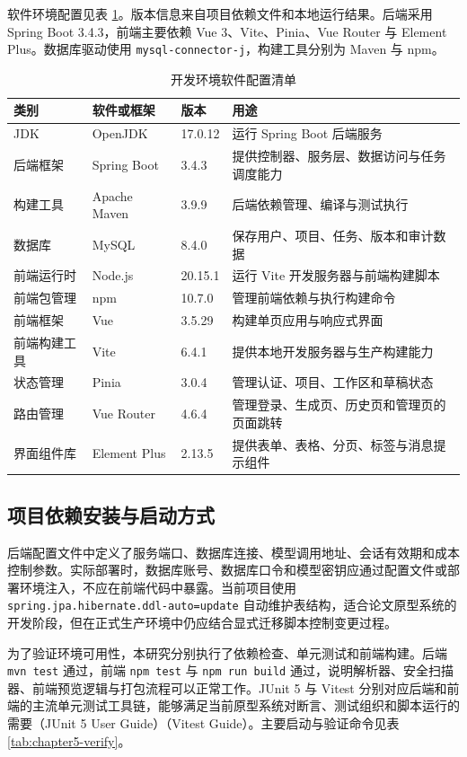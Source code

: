 软件环境配置见表 \ref{tab:chapter5-software}。版本信息来自项目依赖文件和本地运行结果。后端采用 Spring Boot 3.4.3，前端主要依赖 Vue 3、Vite、Pinia、Vue Router 与 Element Plus。数据库驱动使用 \texttt{mysql-connector-j}，构建工具分别为 Maven 与 npm。

\begin{table}[!htbp]
\centering
\caption{开发环境软件配置清单}
\label{tab:chapter5-software}
\small
\begin{tabular}{@{}p{}p{}p{}p{}@{}}
\toprule
类别 & 软件或框架 & 版本 & 用途 \\
\midrule
JDK & OpenJDK & 17.0.12 & 运行 Spring Boot 后端服务 \\
后端框架 & Spring Boot & 3.4.3 & 提供控制器、服务层、数据访问与任务调度能力 \\
构建工具 & Apache Maven & 3.9.9 & 后端依赖管理、编译与测试执行 \\
数据库 & MySQL & 8.4.0 & 保存用户、项目、任务、版本和审计数据 \\
前端运行时 & Node.js & 20.15.1 & 运行 Vite 开发服务器与前端构建脚本 \\
前端包管理 & npm & 10.7.0 & 管理前端依赖与执行构建命令 \\
前端框架 & Vue & 3.5.29 & 构建单页应用与响应式界面 \\
前端构建工具 & Vite & 6.4.1 & 提供本地开发服务器与生产构建能力 \\
状态管理 & Pinia & 3.0.4 & 管理认证、项目、工作区和草稿状态 \\
路由管理 & Vue Router & 4.6.4 & 管理登录、生成页、历史页和管理页的页面跳转 \\
界面组件库 & Element Plus & 2.13.5 & 提供表单、表格、分页、标签与消息提示组件 \\
\bottomrule
\end{tabular}
\end{table}

\subsection{项目依赖安装与启动方式}
后端配置文件中定义了服务端口、数据库连接、模型调用地址、会话有效期和成本控制参数。实际部署时，数据库账号、数据库口令和模型密钥应通过配置文件或部署环境注入，不应在前端代码中暴露。当前项目使用 \texttt{spring.jpa.hibernate.ddl-auto=update} 自动维护表结构，适合论文原型系统的开发阶段，但在正式生产环境中仍应结合显式迁移脚本控制变更过程。

为了验证环境可用性，本研究分别执行了依赖检查、单元测试和前端构建。后端 \texttt{mvn test} 通过，前端 \texttt{npm test} 与 \texttt{npm run build} 通过，说明解析器、安全扫描器、前端预览逻辑与打包流程可以正常工作。JUnit 5 与 Vitest 分别对应后端和前端的主流单元测试工具链，能够满足当前原型系统对断言、测试组织和脚本运行的需要（JUnit 5 User Guide）（Vitest Guide）\cite{junit5docs2025}\cite{vitestdocs2025}。主要启动与验证命令见表 \ref{tab:chapter5-verify}。

